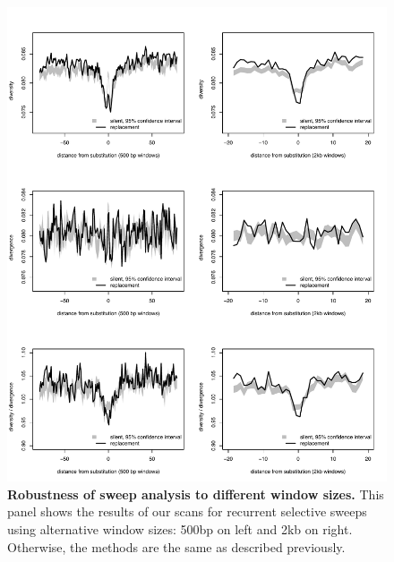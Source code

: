 \begin{figure}[ht!]
      \centering
       \includegraphics[width=\linewidth]{Ch2FigS8}
    \caption{\textbf{Robustness of sweep analysis to different window sizes.} This panel shows the results of our scans for recurrent selective sweeps using alternative window sizes: 500bp on left and 2kb on right. Otherwise, the methods are the same as described previously.}
    \label{fig:figS8}
\end{figure}

